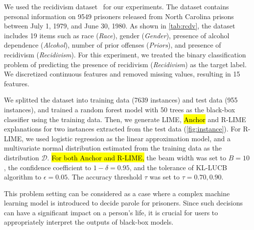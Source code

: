 \documentclass[runningheads]{llncs}
\begin{document}
{We used the recidivism dataset~\cite{schmidt1988predicting} for our experiments.
The dataset contains personal information on 9549 prisoners released from
North Carolina prisons between July 1, 1979, and June 30, 1980.
As shown in \cref{tab:rcdv}, the dataset includes 19 items such as
race (\emph{Race}), gender (\emph{Gender}),
presence of alcohol dependence (\emph{Alcohol}),
number of prior offenses (\emph{Priors}),
and presence of recidivism (\emph{Recidivism}).
For this experiment,
we treated the binary classification problem of predicting
the presence of recidivism (\emph{Recidivism}) as the target label.
We discretized continuous features and removed missing values,
resulting in 15 features.

We splitted the dataset into training data (7639 instances) and test data (955 instances),
and trained a random forest model with 50 trees as the black-box classifier
using the training data.
Then, we generate LIME, \hl{Anchor} and R-LIME explanations
for two instances extracted from the test data (\cref{fig:instance}).
For R-LIME, we used logistic regression as the linear approximation model,
and a multivariate normal distribution estimated from the training data
as the distribution $\mathcal{D}$.
\hl{For both Anchor and R-LIME,} the beam width was set to $B=10$,
the confidence coefficient to $1-\delta=0.95$,
and the tolerance of KL-LUCB algorithm to $\epsilon=0.05$.
The accuracy threshold $\tau$ was set to $\tau=0.70,0.90$.

This problem setting can be considered as a case
where a complex machine learning model is introduced to decide parole for prisoners.
Since such decisions can have a significant impact on a person's life,
it is crucial for users to appropriately interpret the outputs of black-box models.
  {%

    \def\dir{src/experiments/exp1/ver1/examples/output}
    \def\Asample{0012}
    \def\Bsample{0011}

}}
\end{document}
